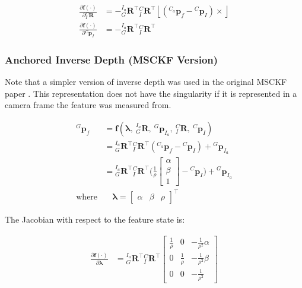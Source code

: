 \begin{align*} \frac{\partial \mathbf f(\cdot)}{\partial {}^{C}_{I}\mathbf{R}} &= -{}^{I_a}_{G}\mathbf{R}^\top{}^{C}_{I}\mathbf{R}^\top \left\lfloor({}^{C_a}\mathbf{p}_f-{}^{C}\mathbf{p}_{I}) \times\right\rfloor \\ \frac{\partial \mathbf f(\cdot)}{\partial {}^{C}\mathbf{p}_{I}} &= -{}^{I_a}_{G}\mathbf{R}^\top{}^{C}_{I}\mathbf{R}^\top \end{align*}\hypertarget{update-feat_feat-rep-anchor-inv2}{}\subsubsection{Anchored Inverse Depth (\+M\+S\+C\+K\+F Version)}\label{update-feat_feat-rep-anchor-inv2}
Note that a simpler version of inverse depth was used in the original M\+S\+C\+KF paper \cite{Mourikis2007ICRA}. This representation does not have the singularity if it is represented in a camera frame the feature was measured from.

\begin{align*} {}^{G}\mathbf{p}_f &= \mathbf f(\boldsymbol\lambda,~{}^{I_a}_{G}\mathbf{R},~{}^{G}\mathbf{p}_{I_a},~{}^{C}_{I}\mathbf{R},~{}^{C}\mathbf{p}_{I}) \\ &= {}^{I_a}_{G}\mathbf{R}^\top{}^{C}_{I}\mathbf{R}^\top({}^{C_a}\mathbf{p}_f-{}^{C}\mathbf{p}_{I}) + {}^{G}\mathbf{p}_{I_a} \\ &= {}^{I_a}_{G}\mathbf{R}^\top{}^{C}_{I}\mathbf{R}^\top\Bigg(\frac{1}{\rho}\begin{bmatrix} \alpha \\ \beta \\ 1 \end{bmatrix}-{}^{C}\mathbf{p}_{I}\Bigg) + {}^{G}\mathbf{p}_{I_a} \\ \text{where} &\quad \boldsymbol\lambda = \begin{bmatrix} \alpha & \beta & \rho \end{bmatrix}^\top \end{align*}

The Jacobian with respect to the feature state is\+:

\begin{align*} \frac{\partial \mathbf f(\cdot)}{\partial \boldsymbol\lambda} &= {}^{I_a}_{G}\mathbf{R}^\top{}^{C}_{I}\mathbf{R}^\top \begin{bmatrix} \frac{1}{\rho} & 0 & -\frac{1}{\rho^2}\alpha \\ 0 & \frac{1}{\rho} & -\frac{1}{\rho^2}\beta \\ 0 & 0 & -\frac{1}{\rho^2} \end{bmatrix} \end{align*}

